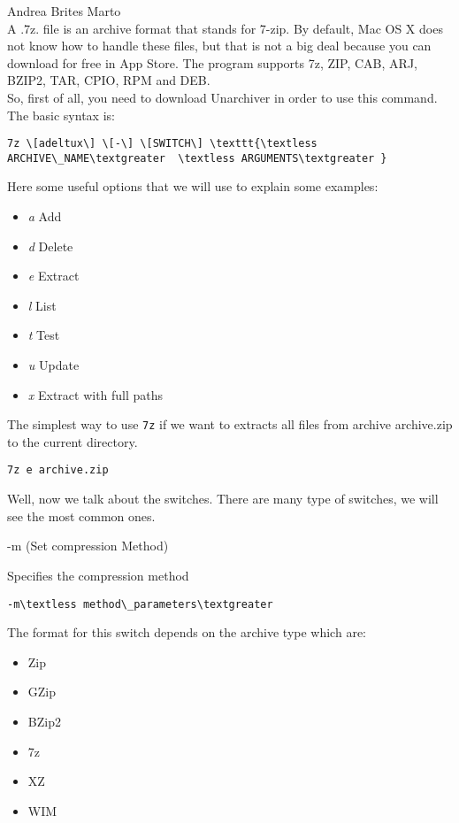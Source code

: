 \documentclass[hidelinks,12pt,a4paper,numbers=enddot]{scrartcl}
\begin{document}
\large Andrea Brites Marto \normalsize\\




A .7z. file is an archive format that stands for 7-zip. By default, Mac OS X does not
know how to handle these files, but that is not a big deal because you can download for
free in App Store. The program supports 7z, ZIP, CAB, ARJ, BZIP2, TAR, CPIO, RPM and DEB.\\

So, first of all, you need to download Unarchiver in order to use this command.\\

The basic syntax is:

\begin{verbatim}
7z \[adeltux\] \[-\] \[SWITCH\] \texttt{\textless ARCHIVE\_NAME\textgreater  \textless ARGUMENTS\textgreater }
\end{verbatim}

Here some useful options that we will use to explain some examples:

\begin{itemize}
    \item \emph{a} Add
    \item \emph{d} Delete
    \item \emph{e} Extract
    \item \emph{l} List
    \item \emph{t} Test
    \item \emph{u} Update
    \item \emph{x} Extract with full paths
\end{itemize}

The simplest way to use \texttt{7z} if we want to extracts all files
from archive archive.zip to the current directory.

\begin{verbatim}
7z e archive.zip
\end{verbatim}


Well, now we talk about the switches.
There are many type of switches, we will see the most common ones.

-m (Set compression Method)


Specifies the compression method

\begin{verbatim}
-m\textless method\_parameters\textgreater 
\end{verbatim}

The format for this switch depends on the archive type which are:
\begin{itemize}
    \item Zip
    \item GZip
    \item BZip2
    \item 7z
    \item XZ
    \item WIM
\end{itemize}
\end{document}
